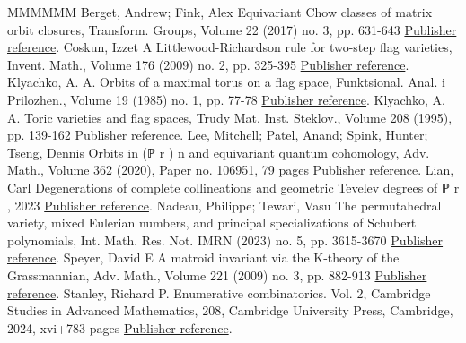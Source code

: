 \documentclass[11pt]{article}
\theoremstyle{definition}
\numberwithin{equation}{section}
\begin{document}
\begin{thebibliography}{MMMMMM}
 Berget, Andrew; Fink, Alex Equivariant Chow classes of matrix orbit closures, Transform. Groups, Volume 22 (2017) no. 3, pp. 631-643 \href{https://alco.centre-mersenne.org/articles/10.5802/alco.359/#BF17}{Publisher reference}.
 Coskun, Izzet A Littlewood-Richardson rule for two-step flag varieties, Invent. Math., Volume 176 (2009) no. 2, pp. 325-395 \href{https://alco.centre-mersenne.org/articles/10.5802/alco.359/#Cos09}{Publisher reference}.
 Klyachko, A. A. Orbits of a maximal torus on a flag space, Funktsional. Anal. i Prilozhen., Volume 19 (1985) no. 1, pp. 77-78 \href{https://alco.centre-mersenne.org/articles/10.5802/alco.359/#K85}{Publisher reference}.
 Klyachko, A. A. Toric varieties and flag spaces, Trudy Mat. Inst. Steklov., Volume 208 (1995), pp. 139-162 \href{https://alco.centre-mersenne.org/articles/10.5802/alco.359/#K95}{Publisher reference}.
 Lee, Mitchell; Patel, Anand; Spink, Hunter; Tseng, Dennis Orbits in (ℙ r ) n  and equivariant quantum cohomology, Adv. Math., Volume 362 (2020), Paper no. 106951, 79 pages \href{https://alco.centre-mersenne.org/articles/10.5802/alco.359/#LPST20}{Publisher reference}.
 Lian, Carl Degenerations of complete collineations and geometric Tevelev degrees of ℙ r , 2023 \href{https://alco.centre-mersenne.org/articles/10.5802/alco.359/#L23}{Publisher reference}.
 Nadeau, Philippe; Tewari, Vasu The permutahedral variety, mixed Eulerian numbers, and principal specializations of Schubert polynomials, Int. Math. Res. Not. IMRN (2023) no. 5, pp. 3615-3670 \href{https://alco.centre-mersenne.org/articles/10.5802/alco.359/#NT23}{Publisher reference}.
 Speyer, David E A matroid invariant via the K-theory of the Grassmannian, Adv. Math., Volume 221 (2009) no. 3, pp. 882-913 \href{https://alco.centre-mersenne.org/articles/10.5802/alco.359/#Spe09}{Publisher reference}.
 Stanley, Richard P. Enumerative combinatorics. Vol. 2, Cambridge Studies in Advanced Mathematics, 208, Cambridge University Press, Cambridge, 2024, xvi+783 pages \href{https://alco.centre-mersenne.org/articles/10.5802/alco.359/#EC2}{Publisher reference}.
\end{thebibliography}
\end{document}
